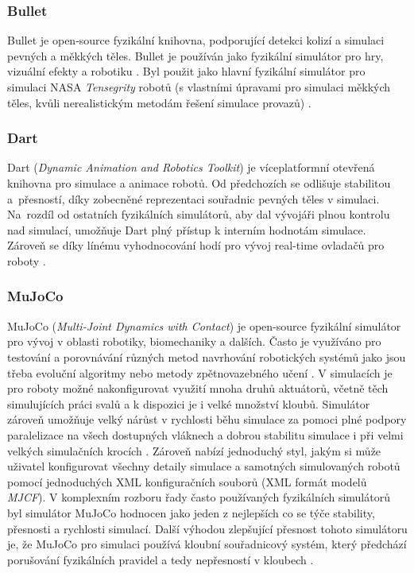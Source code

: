 \subsubsection{Bullet} \label{Bullet}
Bullet je open-source fyzikální knihovna, podporující detekci kolizí a simulaci
pevných a měkkých těles. Bullet je používán jako fyzikální simulátor pro hry,
vizuální efekty a robotiku \citep{coumans}. Byl použit jako hlavní fyzikální
simulátor pro simulaci NASA \emph{Tensegrity} robotů (s vlastními úpravami pro
simulaci měkkých těles, kvůli nerealistickým metodám řešení simulace provazů)
\citep{izadi2018simulating}.

\subsubsection{Dart} \label{Dart}
Dart (\emph{Dynamic Animation and Robotics Toolkit}) je víceplatformní otevřená
knihovna pro simulace a animace robotů. Od předchozích se odlišuje stabilitou
a~přesností, díky zobecněné reprezentaci souřadnic pevných těles v simulaci.
Na~rozdíl od ostatních fyzikálních simulátorů, aby dal vývojáři plnou kontrolu
nad simulací, umožňuje Dart plný přístup k interním hodnotám simulace. Zároveň
se díky línému vyhodnocování hodí pro vývoj real-time ovladačů pro roboty
\citep{lee2018dart}.

\subsubsection{MuJoCo} \label{MuJoCo}
MuJoCo (\emph{Multi-Joint Dynamics with Contact}) \citep{deepmind_2021} je
open-source fyzikální simulátor pro vývoj v oblasti robotiky, biomechaniky a
dalších. Často je využíváno pro testování a porovnávání různých metod
navrhování robotických systémů jako jsou třeba evoluční algoritmy nebo metody
zpětnovazebného učení \citep{salimans2017evolution}. V simulacích je pro roboty
možné nakonfigurovat využití mnoha druhů aktuátorů, včetně těch simulujících
práci svalů a k dispozici je i velké množství kloubů. Simulátor zároveň
umožňuje velký nárůst v rychlosti běhu simulace za pomoci plné podpory
paralelizace na všech dostupných vláknech a dobrou stabilitu simulace i při
velmi velkých simulačních krocích \citep{todorov2012mujoco}. Zároveň nabízí
jednoduchý styl, jakým si může uživatel konfigurovat všechny detaily simulace a
samotných simulovaných robotů pomocí jednoduchých XML konfiguračních souborů
(XML formát modelů \emph{MJCF}). V komplexním rozboru řady často používaných
fyzikálních simulátorů byl simulátor MuJoCo hodnocen jako jeden z nejlepších co
se týče stability, přesnosti a rychlosti simulací. Další výhodou zlepšující
přesnost tohoto simulátoru je, že MuJoCo pro simulaci používá kloubní
souřadnicový systém, který předchází porušování fyzikálních pravidel a tedy
nepřesností v kloubech \citep{erez2015simulation}.

